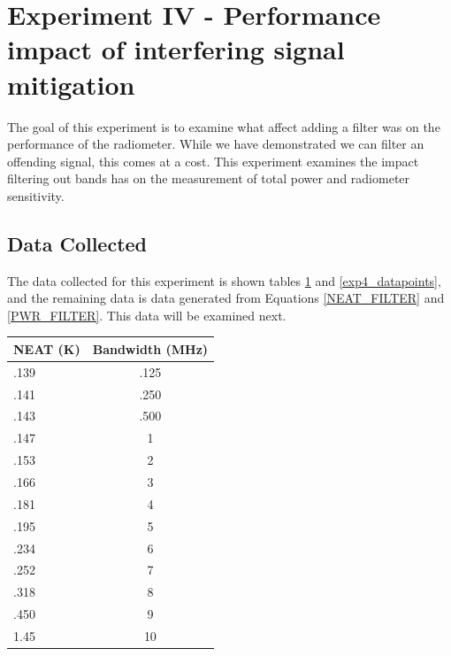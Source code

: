 {\section{Experiment IV - Performance impact of interfering signal mitigation} \label{Exp4_results}
The goal of this experiment is to examine what affect adding a filter was on the performance of the radiometer.  While we have demonstrated we can filter an offending signal, this comes at a cost.  This experiment examines the impact filtering out bands has on the measurement of total power and radiometer sensitivity.

\subsection{Data Collected}
The data collected for this experiment is shown tables \ref{exp4_data_power} and \ref{exp4_datapoints}, and the remaining data is data generated from Equations \ref{NEAT_FILTER} and \ref{PWR_FILTER}.  This data will be examined next.

\begin{table}[h!tb] \centering
{}
\label{exp4_data_power}
\begin{tabular}{lc} \hline
\textbf{NEAT (K)} & \textbf{Bandwidth (MHz) } \\ \hline
.139 & .125 \\
.141 & .250 \\
.143 & .500 \\
.147 & 1 \\
.153 & 2 \\
.166 & 3 \\
.181 & 4 \\
.195 & 5 \\
.234 & 6 \\
.252 & 7 \\
.318 & 8 \\
.450 & 9 \\
1.45 & 10 \\ \hline
\end{tabular}
\end{table}

}
